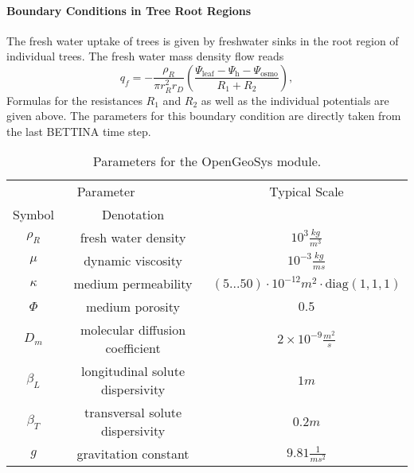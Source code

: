 \paragraph{\textbf{Boundary Conditions in Tree Root Regions}}
The fresh water uptake of trees is given by freshwater sinks in the root region of individual trees.
The fresh water mass density flow reads
\begin{equation}
q_f = - \frac{\rho_R}{\pi r_R^2 r_D}\left(\frac{\Psi_{\text{leaf}} - \Psi_{\text{h}}-\Psi_{\text{osmo}}}{R_1+R_2}\right),
\end{equation}
Formulas for the resistances $R_1$ and $R_2$ as well as the individual potentials are given above.
The parameters for this boundary condition are directly taken from the last BETTINA time step.
\begin{table}[h] \label{tab_ogs_parameter}\centering
\begin{tabular}{|c|c|c|}
\hline 
\multicolumn{2}{|c|}{Parameter} & Typical Scale  \\ 
Symbol & Denotation & \\ 
\hline 
$\rho_R$ & fresh water density & $10^3 \frac{kg}{m^3}$ \\ 
\hline 
$\mu$ & dynamic viscosity & $10^{-3} \frac{kg}{ms}$ \\ 
\hline 
$\kappa$ & medium permeability & $(5...50)\cdot 10^{-12} m^2 \cdot{\text{diag}\left(1,1,1\right)}$ \\ 
\hline 
$\Phi$ & medium porosity & $0.5$ \\ 
\hline 
$D_m$ & molecular diffusion coefficient & $2\times 10^{-9} \frac{m^2}{s}$ \\ 
\hline 
$\beta_L$ & longitudinal solute dispersivity & $1m$ \\ 
\hline 
$\beta_T$ & transversal solute dispersivity & $0.2m$ \\  
\hline 
$g$ & gravitation constant & $9.81 \frac{1}{ms^2}$ \\  
\hline 
\end{tabular} 
\caption{Parameters for the OpenGeoSys module.}
\end{table}
%
%
%

